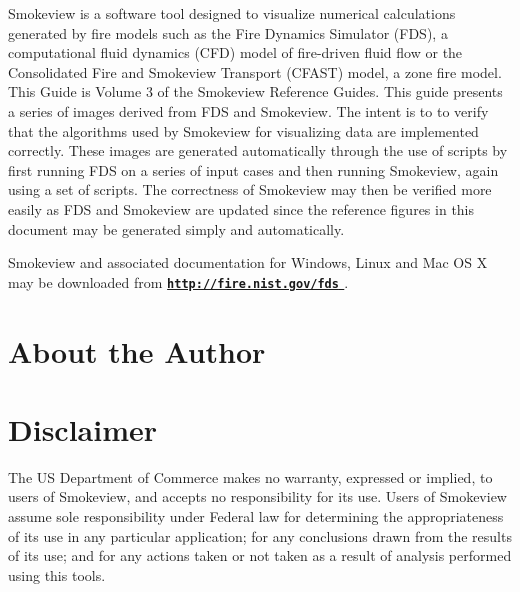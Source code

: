 \documentclass[11pt,twoside]{book}
\newcommand{\hhref}[1]{\href{#1}{{\tt #1}
}}
\begin{document}
Smokeview is a software tool designed to visualize numerical
calculations generated by fire models such as the Fire Dynamics Simulator (FDS),
a computational fluid dynamics (CFD) model of fire-driven fluid
flow or the Consolidated Fire and Smokeview Transport (CFAST) model, a zone fire model. This Guide is Volume 3 of the Smokeview Reference
Guides.
This guide presents a series of images derived from FDS and Smokeview.  The intent is to to verify that the algorithms used by Smokeview for visualizing data are implemented correctly.  These images are generated automatically through the use of scripts by first running FDS on a series of input cases and then running Smokeview, again using a set of scripts.  The correctness of Smokeview may then be verified more easily as FDS and Smokeview are updated since the reference figures in this document may be generated simply and automatically.

Smokeview and associated
documentation for Windows, Linux and Mac OS X may be downloaded from  {\bf
\hhref{http://fire.nist.gov/fds}} .


\chapter{About the Author}
\begin{description}
\gforneybio
\end{description}


\chapter{Disclaimer}

The US Department of Commerce makes no warranty,
expressed or implied, to users of Smokeview, and accepts no
responsibility for its use. Users of Smokeview assume sole
responsibility under Federal law for determining the
appropriateness of its use in any particular application; for any
conclusions drawn from the results of its use; and for any actions
taken or not taken as a result of analysis performed using this
tools.
\end{document}
